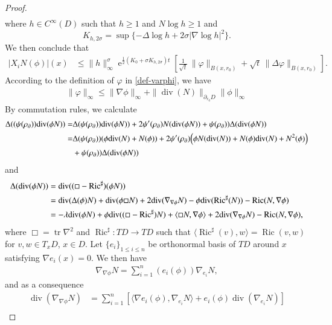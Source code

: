 \documentclass[11pt,reqno]{amsart}
\theoremstyle{definition} \newtheorem{remark}[theorem]{Remark}
\numberwithin{equation}{section}
\def\Ric{{\operatorname{Ric}}} \def\Hess{\operatorname{Hess}}
\def\tr{\operatorname{tr}}
\def\div{{\operatorname{div}}}
\newcommand\1{\mathbbm{1}}
\def\Ric{{\operatorname{Ric}}} \def\Aut{{\operatorname{Aut}}}
\def\r{\right}
\def\l{\left} \def\e{\operatorname{e}} \def\dsum{\displaystyle\sum}
\begin{document}
\begin{proof}
\begin{align*}
 \end{align*}
 where $h\in C^{\infty}(D)$ such that $h\geq 1$ and $N\log h \geq 1$ and
$$K_{h,2\sigma}=\sup\{-\Delta\log h+2\sigma |\nabla \log h|^2\}.$$
We then conclude that
 \begin{align}\label{boundaryHessian-1} 
 |X_iN(\phi)|(x)&\leq \|h\|_{\infty}^{\sigma}\e^{\frac{1}{2}(K_0+\sigma K_{h,2\sigma})t}\l[\frac{1}{\sqrt{t}}\,\|\varphi\|_{B(x,r_0)}+ \sqrt{t} \,\|\Delta \varphi\|_{B(x, r_0)}   \r].
 \end{align} 
According to the definition of $\varphi$ in \eqref{def-varphi}, we have
 \begin{align*}
\|\varphi\|_{\infty} \leq \| \nabla \phi\|_{\infty}+\|\div(N)\|_{\partial_{r_0}D} \|\phi\|_{\infty}
 \end{align*}
 By commutation rules, we calculate 
 \begin{align}\label{delta-est1}
 \Delta ((\psi(\rho_{\partial})) \div (\phi N))=& \Delta (\psi (\rho_{\partial})) \div (\phi N))
 +2\psi'(\rho_{\partial}) N(\div(\phi N))+\psi (\rho_{\partial})) \Delta (\div (\phi N))\notag\\
 =& \Delta (\psi (\rho_{\partial})) (\phi \div(N)+N(\phi))
 +2\psi'(\rho_{\partial}) \Big(\phi N(\div(N))+N(\phi) \div(N)+N^2(\phi)\Big)\notag\\
 &+\psi (\rho_{\partial})) \Delta (\div (\phi N))
 \end{align}
 and 
 \begin{align}\label{delta-est2}
 \Delta (\div (\phi N))&= \div ((\Box-\Ric^{\sharp})(\phi N) )\notag\\
 &= \div(\Delta (\phi) N)+ \div(\phi\Box N)+2\div(\nabla _{\nabla \phi}N)-\phi \div (\Ric^{\sharp}(N))-\Ric(N,\nabla\phi)\notag\\
 &= -\lambda \div(\phi N)+\phi \div((\Box-\Ric^{\sharp}) N)+\langle \Box N, \nabla \phi \rangle+2\div(\nabla _{\nabla \phi}N)-\Ric(N,\nabla\phi),
 \end{align}
 where $\Box =\tr \nabla^2$ and $\Ric^{\sharp}\colon TD\rightarrow TD$ such that $\langle \Ric^{\sharp}(v), w \rangle=\Ric(v,w)$ for $v,w\in T_xD$, $x\in D$. 
 Let $\{e_i\}_{1\leq i\leq n}$ be orthonormal basis of $TD$ around $x$ satisfying $\nabla e_i(x)=0$. 
 We then have
 \begin{align*}
 \nabla _{\nabla \phi}N=\sum_{i=1}^n (e_i(\phi)) \nabla _{e_i}N,
 \end{align*}
 and as a consequence
 \begin{align*}
 \div (\nabla _{\nabla \phi} N)&=\sum_{i=1}^n\l[ \langle \nabla e_i(\phi), \nabla_{e_i}N\rangle +e_i(\phi) \div(\nabla _{e_i}N)\r]\\

\end{align*}
\end{proof}
\end{document}

